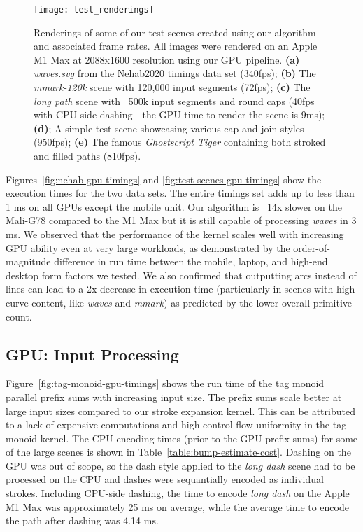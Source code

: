 \documentclass[sigconf, authordraft]{acmart}
\begin{document}
\begin{figure}
    \centering
    \texttt{[image: test\_renderings]}
    \caption{Renderings of some of our test scenes created using our algorithm and associated frame rates. All images were rendered on an Apple M1 Max at 2088x1600 resolution using our GPU pipeline. \textbf{(a)} \emph{waves.svg} from the Nehab2020 timings data set (340fps); \textbf{(b)} The \emph{mmark-120k} scene with 120,000 input segments (72fps); \textbf{(c)} The \emph{long path} scene with ~500k input segments and round caps (40fps with CPU-side dashing - the GPU time to render the scene is 9ms); \textbf{(d)}; A simple test scene showcasing various cap and join styles (950fps); \textbf{(e)} The famous \emph{Ghostscript Tiger} containing both stroked and filled paths (810fps).}
    \label{fig:renderings}
\end{figure}

Figures~\ref{fig:nehab-gpu-timings} and \ref{fig:test-scenes-gpu-timings} show the execution times for the two data sets. The entire \citet{Nehab2020} timings set adds up to less than 1 ms on all GPUs except the mobile unit. Our algorithm is ~14x slower on the Mali-G78 compared to the M1 Max but it is still capable of processing \emph{waves} in 3 ms. We observed that the performance of the kernel scales well with increasing GPU ability even at very large workloads, as demonstrated by the order-of-magnitude difference in run time between the mobile, laptop, and high-end desktop form factors we tested. We also confirmed that outputting arcs instead of lines can lead to a 2x decrease in execution time (particularly in scenes with high curve content, like \emph{waves} and \emph{mmark}) as predicted by the lower overall primitive count.

\subsection{GPU: Input Processing} \label{subsection:encoding-results}

Figure~\ref{fig:tag-monoid-gpu-timings} shows the run time of the tag monoid parallel prefix sums with increasing input size. The prefix sums scale better at large input sizes compared to our stroke expansion kernel. This can be attributed to a lack of expensive computations and high control-flow uniformity in the tag monoid kernel. The CPU encoding times (prior to the GPU prefix sums) for some of the large scenes is shown in Table~\ref{table:bump-estimate-cost}. Dashing on the GPU was out of scope, so the dash style applied to the \emph{long dash} scene had to be processed on the CPU and dashes were sequantially encoded as individual strokes. Including CPU-side dashing, the time to encode \emph{long dash} on the Apple M1 Max was approximately 25 ms on average, while the average time to encode the path after dashing was 4.14 ms.
\end{document}
